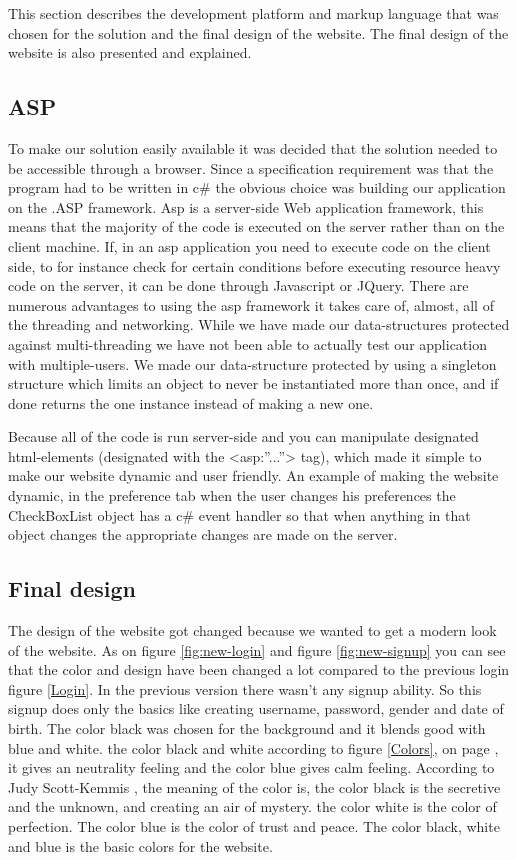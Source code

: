 This section describes the development platform and markup language that was chosen for the solution and the final design of the website. The final design of the website is also presented and explained.

\subsection{ASP}
To make our solution easily available it was decided that the solution needed to be accessible through a browser. Since a specification requirement was that the program had to be written in c\# the obvious choice was building our application on the .ASP framework. Asp is a server-side Web application framework, this means that the majority of the code is executed on the server rather than on the client machine. If, in an asp application you need to execute code on the client side, to for instance check for certain conditions before executing resource heavy code on the server, it can be done through Javascript or JQuery. There are numerous advantages to using the asp framework it takes care of, almost, all of the threading and networking. While we have made our data-structures protected against multi-threading we have not been able to actually test our application with multiple-users. We made our data-structure protected by using a singleton structure which limits an object to never be instantiated more than once, and if done returns the one instance instead of making a new one.

Because all of the code is run server-side and you can manipulate designated html-elements  (designated with the <asp:”...”> tag), which made it simple to make our website dynamic and user friendly. An example of making the website dynamic, in the preference tab when the user changes his preferences the CheckBoxList object has a c\# event handler so that when anything in that object changes the appropriate changes are made on the server.

\subsection{Final design}
The design of the website got changed because we wanted to get a modern look of the website. As on figure \ref{fig:new-login} and figure \ref{fig:new-signup} you can see that the color and design have been changed a lot compared to the previous login figure \ref{Login}. In the previous version there wasn’t any signup ability. So this signup does only the basics like creating username, password, gender and date of birth. The color black was chosen for the background and it blends good with blue and white. the color black and white according to figure \ref{Colors}, on page \pageref{Colors}, it gives an neutrality feeling and the color blue gives calm feeling. According to Judy Scott-Kemmis \cite{EmpowerColor}, the meaning of the color is,  the color black is the secretive and the unknown, and creating an air of mystery. the color white is the color of perfection. The color blue is the color of trust and peace. The color black, white and blue is the basic colors for the website.


